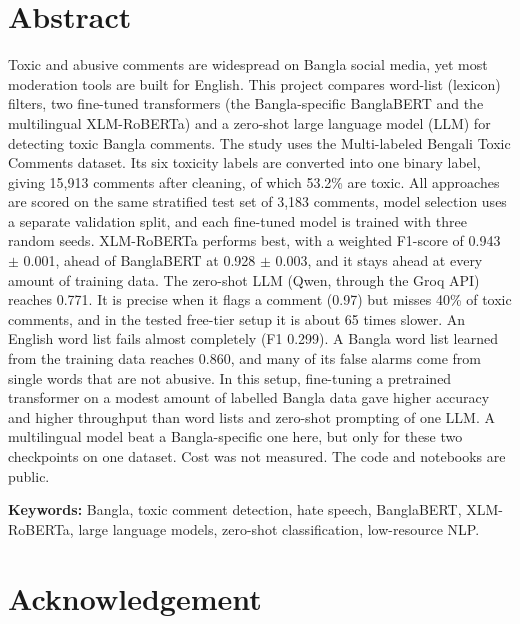 \documentclass[12pt]{report}
\begin{document}
\newpage
{}

\chapter*{Abstract}
\justifying

Toxic and abusive comments are widespread on Bangla social media, yet most moderation tools are built for English. This project compares word-list (lexicon) filters, two fine-tuned transformers (the Bangla-specific BanglaBERT and the multilingual XLM-RoBERTa) and a zero-shot large language model (LLM) for detecting toxic Bangla comments. The study uses the Multi-labeled Bengali Toxic Comments dataset. Its six toxicity labels are converted into one binary label, giving 15,913 comments after cleaning, of which 53.2\% are toxic. All approaches are scored on the same stratified test set of 3,183 comments, model selection uses a separate validation split, and each fine-tuned model is trained with three random seeds. XLM-RoBERTa performs best, with a weighted F1-score of 0.943 $\pm$ 0.001, ahead of BanglaBERT at 0.928 $\pm$ 0.003, and it stays ahead at every amount of training data. The zero-shot LLM (Qwen, through the Groq API) reaches 0.771. It is precise when it flags a comment (0.97) but misses 40\% of toxic comments, and in the tested free-tier setup it is about 65 times slower. An English word list fails almost completely (F1 0.299). A Bangla word list learned from the training data reaches 0.860, and many of its false alarms come from single words that are not abusive. In this setup, fine-tuning a pretrained transformer on a modest amount of labelled Bangla data gave higher accuracy and higher throughput than word lists and zero-shot prompting of one LLM. A multilingual model beat a Bangla-specific one here, but only for these two checkpoints on one dataset. Cost was not measured. The code and notebooks are public.

\textbf{Keywords:} Bangla, toxic comment detection, hate speech, BanglaBERT, XLM-RoBERTa, large language models, zero-shot classification, low-resource NLP.

\chapter*{Acknowledgement}
\end{document}
